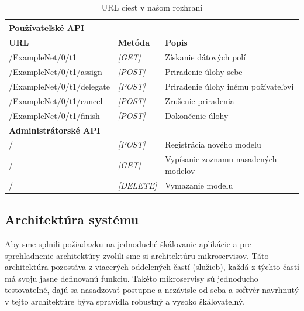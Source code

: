 \begin{table}
\begin{tabular}{|l|ll|}
\hline
\textbf{Používateľské API}     &                                            &                                      \\ \hline
\textbf{URL}                   & \multicolumn{1}{l|}{\textbf{Metóda}}       & \textbf{Popis}                       \\ \hline
/ExampleNet/0/t1               & \multicolumn{1}{l|}{\textit{{[}GET{]}}}    & Získanie dátových polí               \\ \hline
/ExampleNet/0/t1/assign        & \multicolumn{1}{l|}{\textit{{[}POST{]}}}   & Priradenie úlohy sebe                \\ \hline
/ExampleNet/0/t1/delegate      & \multicolumn{1}{l|}{\textit{{[}POST{]}}}   & Priradenie úlohy inému požívateľovi   \\ \hline
/ExampleNet/0/t1/cancel        & \multicolumn{1}{l|}{\textit{{[}POST{]}}}   & Zrušenie priradenia                  \\ \hline
/ExampleNet/0/t1/finish        & \multicolumn{1}{l|}{\textit{{[}POST{]}}}   & Dokončenie úlohy                     \\ \hline
\textbf{Administrátorské API} & \textit{}                                  &                                      \\ \hline
/                              & \multicolumn{1}{l|}{\textit{{[}POST{]}}}   & Registrácia nového modelu            \\ \hline
/                              & \multicolumn{1}{l|}{\textit{{[}GET{]}}}    & Vypísanie zoznamu nasadených modelov \\ \hline
/                              & \multicolumn{1}{l|}{\textit{{[}DELETE{]}}} & Vymazanie modelu                     \\ \hline
\end{tabular}
\caption{URL ciest v našom rozhraní}
\label{urls_table}
\end{table} 

\subsection{Architektúra systému}
Aby sme splnili požiadavku na jednoduché škálovanie aplikácie a pre sprehľadnenie architektúry zvolili sme si architektúru mikroservisov. Táto architektúra pozostáva z viacerých oddelených častí (služieb), každá z týchto častí má svoju jasne definovanú funkciu. Takéto mikroservisy sú jednoducho testovateľné, dajú sa nasadzovať postupne a nezávisle od seba a softvér navrhnutý v tejto architektúre býva spravidla robustný a vysoko škálovateľný.

